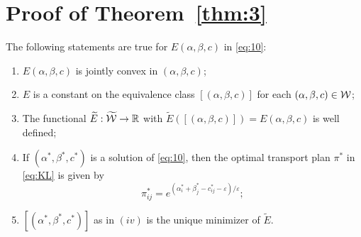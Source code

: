 \section{Proof of Theorem~\ref{thm:3}} 
\label{sec:proofthm3}
\setcounter{theorem}{3}
\begin{theorem}
	The following statements are true for $E(\alpha, \beta, c)$ in \eqref{eq:10}:
	\begin{enumerate}[label=(\roman*)]
		\item $E(\alpha, \beta, c)$ is jointly convex in $(\alpha, \beta, c)$;
		\item $E$ is a constant on the equivalence class $[(\alpha, \beta, c)]$ for each $(\alpha, \beta, c) \in \mathcal{W}$; 
		\item The functional $\widetilde{E}: \widetilde{\mathcal{W}} \rightarrow \mathbb{R}$ with $\widetilde{E}([(\alpha, \beta, c)]) = E(\alpha, \beta, c)$ is well defined;
		\item If $(\alpha^*, \beta^*, c^*)$ is a solution of \eqref{eq:10}, then the optimal transport plan $\pi^*$ in \eqref{eq:KL} is given by 
		\[\pi^*_{ij} = e^{(\alpha^*_i + \beta^*_j - c^*_{ij}-\varepsilon)/\varepsilon};\]
		\item $[(\alpha^*, \beta^*, c^*)]$ as in $(iv)$ is the unique minimizer of $\widetilde{E}$. 
	\end{enumerate}
\end{theorem}
